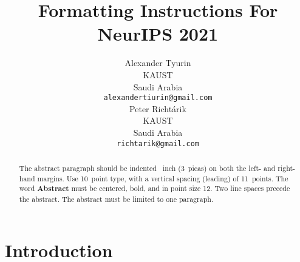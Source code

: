 \documentclass{article}
\title{Formatting Instructions For NeurIPS 2021}
\author{%
  Alexander Tyurin\\
  KAUST\\
  Saudi Arabia\\
  \texttt{alexandertiurin@gmail.com} \\
  \And
  Peter Richt\'{a}rik \\
  KAUST\\
  Saudi Arabia\\
  \texttt{richtarik@gmail.com} \\
}
\begin{document}
\maketitle

\begin{abstract}
  The abstract paragraph should be indented ~inch (3~picas) on
  both the left- and right-hand margins. Use 10~point type, with a vertical
  spacing (leading) of 11~points.  The word \textbf{Abstract} must be centered,
  bold, and in point size 12. Two line spaces precede the abstract. The abstract
  must be limited to one paragraph.
\end{abstract}

\section{Introduction}

\newcommand*{\probavailable}{\ensuremath{p_{\textnormal{a}}}}
\newcommand*{\probpairaa}{\ensuremath{p_{\textnormal{aa}}}}
\newcommand*{\probpairan}{\ensuremath{p_{\textnormal{an}}}}
\newcommand*{\probpairnn}{\ensuremath{p_{\textnormal{nn}}}}

\newcommand*{\probpage}{\ensuremath{p_{\text{page}}}}
\end{document}
